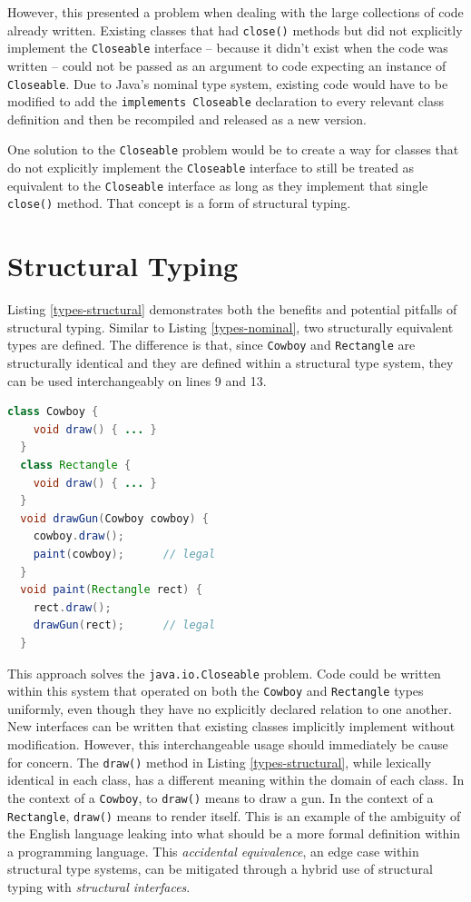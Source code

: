 However, this presented a problem when dealing with the large collections of code already written.  Existing classes that had \texttt{close()} methods but did not explicitly implement the \texttt{Closeable} interface -- because it didn't exist when the code was written -- could not be passed as an argument to code expecting an instance of \texttt{Closeable}.  Due to Java's nominal type system, existing code would have to be modified to add the \texttt{implements Closeable} declaration to every relevant class definition and then be recompiled and released as a new version.

One solution to the \texttt{Closeable} problem would be to create a way for classes that do not explicitly implement the \texttt{Closeable} interface to still be treated as equivalent to the \texttt{Closeable} interface as long as they implement that single \texttt{close()} method.  That concept is a form of structural typing.

\section{Structural Typing}

Listing \ref{types-structural} demonstrates both the benefits and potential pitfalls of structural typing.  Similar to Listing \ref{types-nominal}, two structurally equivalent types are defined.  The difference is that, since \texttt{Cowboy} and \texttt{Rectangle} are structurally identical and they are defined within a structural type system, they can be used interchangeably on lines 9 and 13.

\begin{lstlisting}[language=Java,caption=Structural types,label=types-structural]
  class Cowboy {
    void draw() { ... }
  }
  class Rectangle {
    void draw() { ... }
  }
  void drawGun(Cowboy cowboy) {
    cowboy.draw();
    paint(cowboy);      // legal
  }
  void paint(Rectangle rect) {
    rect.draw();
    drawGun(rect);      // legal
  }
\end{lstlisting}

This approach solves the \texttt{java.io.Closeable} problem.  Code could be written within this system that operated on both the \texttt{Cowboy} and \texttt{Rectangle} types uniformly, even though they have no explicitly declared relation to one another.  New interfaces can be written that existing classes implicitly implement without modification.  However, this interchangeable usage should immediately be cause for concern.  The \texttt{draw()} method in Listing \ref{types-structural}, while lexically identical in each class, has a different meaning within the domain of each class.  In the context of a \texttt{Cowboy}, to \texttt{draw()} means to draw a gun.  In the context of a \texttt{Rectangle}, \texttt{draw()} means to render itself.  This is an example of the ambiguity of the English language leaking into what should be a more formal definition within a programming language.  This \emph{accidental equivalence}, an edge case within structural type systems, can be mitigated through a hybrid use of structural typing with \emph{structural interfaces}.


